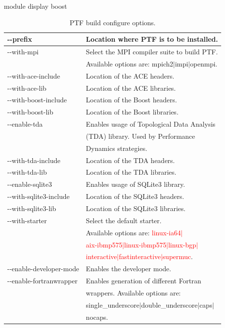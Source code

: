 \documentclass[11pt,a4paper, oneside]{book} %
\begin{document}
module display boost

\begin{table}[h]
\begin{center}
  \begin{tabular}{ | l | l | }
    \hline
    -{}-prefix                & Location where PTF is to be installed.\\ \hline
    -{}-with-mpi              & Select the MPI compiler suite to build PTF.\\
                              & Available options are: mpich2$|$impi$|$openmpi.\\ \hline
    -{}-with-ace-include      & Location of the ACE headers.\\ \hline
    -{}-with-ace-lib          & Location of the ACE libraries.\\ \hline
    -{}-with-boost-include    & Location of the Boost headers.\\ \hline
    -{}-with-boost-lib        & Location of the Boost libraries.\\ \hline
    -{}-enable-tda            & Enables usage of Topological Data Analysis\\
                              & (TDA) library. Used by Performance\\
                              & Dynamics strategies.\\ \hline
    -{}-with-tda-include      & Location of the TDA headers.\\ \hline
    -{}-with-tda-lib          & Location of the TDA libraries.\\ \hline
    -{}-enable-sqlite3        & Enables usage of SQLite3 library.\\ \hline
    -{}-with-sqlite3-include  & Location of the SQLite3 headers.\\ \hline
    -{}-with-sqlite3-lib      & Location of the SQLite3 libraries.\\ \hline
    -{}-with-starter          & Select the default starter.\\
                              & Available options are: \textcolor{red}{linux-ia64$|$}\\
                              & \textcolor{red}{aix-ibmp575$|$linux-ibmp575$|$linux-bgp$|$}\\
                              & \textcolor{red}{interactive$|$fastinteractive$|$supermuc}.\\ \hline
    -{}-enable-developer-mode & Enables the developer mode.\\ \hline
    -{}-enable-fortranwrapper & Enables generation of different Fortran\\
                              & wrappers. Available options are:\\
                              & single\_underscore$|$double\_underscore$|$caps$|$\\
                              & nocaps.\\ \hline
  \end{tabular}
\end{center}
\caption{PTF build configure options.}\label{tab:PTFbuildconfig}
\end{table}
\end{document}
